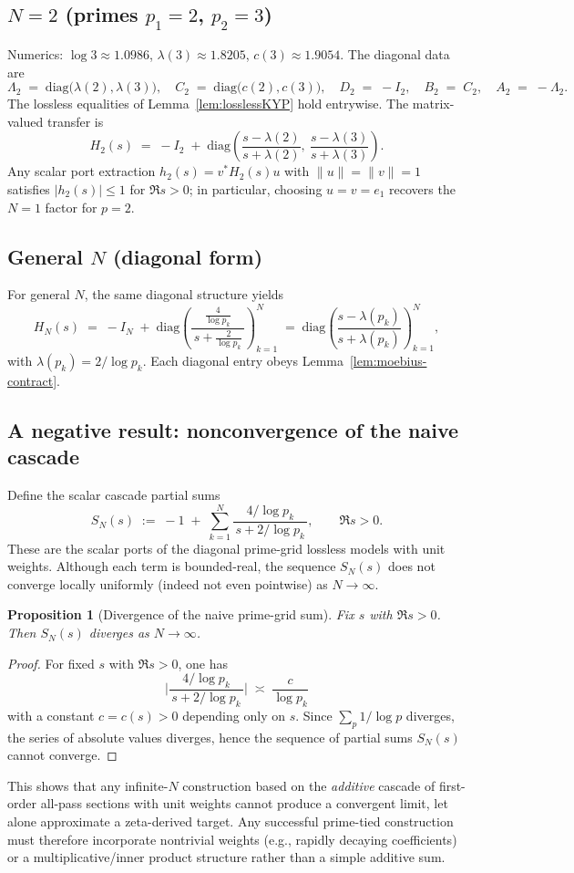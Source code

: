 \documentclass[11pt]{article}
\newtheorem{proposition}[theorem]{Proposition}
\theoremstyle{definition}
\theoremstyle{remark}
\begin{document}
\subsection*{$N=2$ (primes $p_1=2$, $p_2=3$)}
Numerics: \(\log 3\approx 1.0986\), \(\lambda(3)\approx 1.8205\), \(c(3)\approx 1.9054\). The diagonal data are
\[
 \Lambda_2\;=\;\mathrm{diag}\big(\lambda(2),\lambda(3)\big),\quad C_2\;=\;\mathrm{diag}\big(c(2),c(3)\big),\quad D_2\;=\;-I_2,\quad B_2\;=\;C_2,\quad A_2\;=\;-\Lambda_2.
\]
The lossless equalities of Lemma~\ref{lem:losslessKYP} hold entrywise. The matrix-valued transfer is
\[
 H_2(s)\;=\;-I_2\; +\; \mathrm{diag}\!\left(\frac{s-\lambda(2)}{s+\lambda(2)},\ \frac{s-\lambda(3)}{s+\lambda(3)}\right).
\]
Any scalar port extraction \(h_2(s)=v^*H_2(s)u\) with \(\|u\|=\|v\|=1\) satisfies \(|h_2(s)|\le 1\) for \(\Re s>0\); in particular, choosing \(u=v=e_1\) recovers the \(N=1\) factor for \(p=2\).

\subsection*{General $N$ (diagonal form)}
For general \(N\), the same diagonal structure yields
\[
 H_N(s)\;=\;-I_N\; +\; \mathrm{diag}\!\left(\frac{\tfrac{4}{\log p_k}}{\,s+\tfrac{2}{\log p_k}\,}\right)_{k=1}^N\;=\;\mathrm{diag}\!\left(\frac{s-\lambda(p_k)}{s+\lambda(p_k)}\right)_{k=1}^N,
\]
with \(\lambda(p_k)=2/\log p_k\). Each diagonal entry obeys Lemma~\ref{lem:moebius-contract}.

\subsection*{A negative result: nonconvergence of the naive cascade}
Define the scalar cascade partial sums
\[
 S_N(s)\;:=\;-1\; +\;\sum_{k=1}^{N} \frac{4/\log p_k}{\,s+2/\log p_k\,},\qquad \Re s>0.
\]
These are the scalar ports of the diagonal prime-grid lossless models with unit weights. Although each term is bounded-real, the sequence \(S_N(s)\) does not converge locally uniformly (indeed not even pointwise) as \(N\to\infty\).
\begin{proposition}[Divergence of the naive prime-grid sum]\label{prop:divergence}
Fix \(s\) with \(\Re s>0\). Then \(S_N(s)\) diverges as \(N\to\infty\).
\end{proposition}
\begin{proof}
For fixed \(s\) with \(\Re s>0\), one has
\[
 \Big|\frac{4/\log p_k}{\,s+2/\log p_k\,}\Big|\;\asymp\; \frac{c}{\log p_k}
\]
with a constant \(c=c(s)>0\) depending only on \(s\). Since \(\sum_{p}\!1/\log p\) diverges, the series of absolute values diverges, hence the sequence of partial sums \(S_N(s)\) cannot converge.
\end{proof}
\noindent This shows that any infinite-$N$ construction based on the \emph{additive} cascade of first-order all-pass sections with unit weights cannot produce a convergent limit, let alone approximate a zeta-derived target. Any successful prime-tied construction must therefore incorporate nontrivial weights (e.g., rapidly decaying coefficients) or a multiplicative/inner product structure rather than a simple additive sum.
\end{document}
